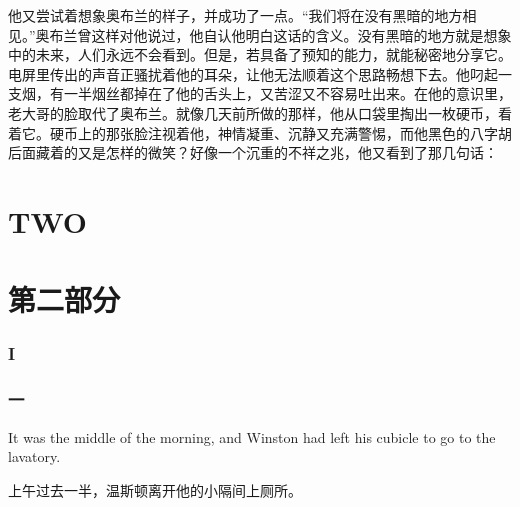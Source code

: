 \begin{paracol}{2}
\switchcolumn

他又尝试着想象奥布兰的样子，并成功了一点。``我们将在没有黑暗的地方相见。''奥布兰曾这样对他说过，他自认他明白这话的含义。没有黑暗的地方就是想象中的未来，人们永远不会看到。但是，若具备了预知的能力，就能秘密地分享它。电屏里传出的声音正骚扰着他的耳朵，让他无法顺着这个思路畅想下去。他叼起一支烟，有一半烟丝都掉在了他的舌头上，又苦涩又不容易吐出来。在他的意识里，老大哥的脸取代了奥布兰。就像几天前所做的那样，他从口袋里掏出一枚硬币，看着它。硬币上的那张脸注视着他，神情凝重、沉静又充满警惕，而他黑色的八字胡后面藏着的又是怎样的微笑？好像一个沉重的不祥之兆，他又看到了那几句话：

\switchcolumn*


\switchcolumn


\switchcolumn*


\clearpage
\part{TWO}\label{two}

\switchcolumn

\part*{第二部分}

\switchcolumn*

\section{I}

\switchcolumn

\section*{一}\label{ux4e5d}

\switchcolumn*

It was the middle of the morning, and Winston had left his cubicle to go
to the lavatory.

\switchcolumn

上午过去一半，温斯顿离开他的小隔间上厕所。

\switchcolumn*


\end{paracol}
